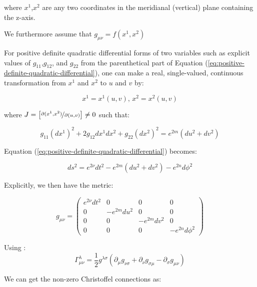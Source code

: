 \documentclass{article}
\begin{document}
where $x^{1}$,$x^{2}$ are any two coordinates in the meridianal (vertical)
plane containing the z-axis.

We furthermore assume that $g_{\mu\nu}=f\left(x^{1},x^{2}\right)$

For positive definite quadratic differential forms of two variables
such as explicit values of $g_{11}$,$g_{12}$, and $g_{22}$ from
the parenthetical part of Equation (\ref{eq:positive-definite-quadratic-differential}),
one can make a real, single-valued, continuous transformation from
$x^{1}$ and $x^{2}$ to $u$ and $v$ by:

\begin{equation}
x^{1}=x^{1}(u,v),\, x^{2}=x^{2}(u,v)
\end{equation}

where $J=\left[\nicefrac{\partial(x^{1},x^{2})}{\partial(u,v)}\right]\neq0$
such that:

\begin{equation}
g_{11}\left(dx^{1}\right)^{2}+2g_{12}dx^{1}dx^{2}+g_{22}\left(dx^{2}\right)^{2}=e^{2m}\left(du^{2}+dv^{2}\right)
\end{equation}

Equation (\ref{eq:positive-definite-quadratic-differential}) becomes:

\begin{equation}
ds^{2}=e^{2\nu}dt^{2}-e^{2m}(du^{2}+dv^{2})-e^{2n}d\phi^{2}\label{eq:generic-axisymmetric-static-metric}
\end{equation}

Explicitly, we then have the metric:

\begin{equation}
g_{\mu\nu}=\left(\begin{array}{cccc}
e^{2\nu}dt^{2} & 0 & 0 & 0\\
0 & -e^{2m}du^{2} & 0 & 0\\
0 & 0 & -e^{2m}dv^{2} & 0\\
0 & 0 & 0 & -e^{2n}d\phi^{2}
\end{array}\right)\label{eq:general-axisymmetric-static-matrix-metric}
\end{equation}

Using \cite{carroll2003spacetime}: 
\begin{equation}
\Gamma_{\mu\nu}^{\lambda}=\frac{1}{2}g^{\lambda\sigma}\left(\partial_{\mu}g_{\nu\sigma}+\partial_{\nu}g_{\sigma\mu}-\partial_{\sigma}g_{\mu\nu}\right)
\end{equation}

We can get the non-zero Christoffel connections as:
\end{document}
